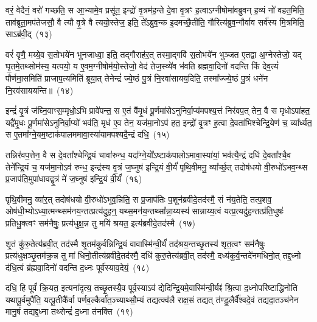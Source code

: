 वरं॒ वेदैनं॒ वरो॑ गच्छति॒ स आ॒भ्यामे॒व प्रसू॑त॒ इन्द्रो॑ वृ॒त्रम॑ह॒न्ते दे॒वा वृ॒त्रꣳ ह॒त्वा\-ऽग्नी\-षोमा॑वब्रुवन् ह॒व्यं नो॑ वहत॒मिति॒ ताव॑ब्रूता॒मप॑तेजसौ॒ वै त्यौ वृ॒त्रे वै त्ययो॒स्तेज॒ इति॒ ते᳚\-ऽब्रुव॒न्क इ॒दमच्छै॒तीति॒ गौरित्य॑ब्रुव॒न्गौर्वाव सर्व॑स्य मि॒त्रमिति॒ सा\-ऽब्र॑वी॒द्~(१३)\ip

वरं॑ वृणै॒ मय्ये॒व स॒तोभये॑न भुनजाध्वा॒ इति॒ तद्गौराह॑र॒त् तस्मा॒द्गवि॑ स॒तोभये॑न भुञ्जत ए॒तद्वा अ॒ग्नेस्तेजो॒ यद् घृ॒तमे॒तथ्सोम॑स्य॒ यत्पयो॒ य ए॒वम॒ग्नी\-षोम॑यो॒स्तेजो॒ वेद॑ तेज॒स्व्ये॑व भ॑वति ब्रह्मवा॒दिनो॑ वदन्ति किं देव॒त्यं॑ पौर्णमा॒समिति॑ प्राजाप॒त्यमिति॑ ब्रूया॒त् तेनेन्द्रं॑ ज्ये॒ष्ठं पु॒त्रं नि॒रवा॑सायय॒दिति॒ तस्मा᳚ज्ज्ये॒ष्ठं पु॒त्रं धने॑न नि॒रव॑साययन्ति॥~(१४)\ip

{\anuvakamend[{अ॒स्य॒ मा वेदा द्यावा॑पृथि॒व्योर॑ब्रवी॒दिति॒ तस्मा᳚च्च॒त्वारि॑ च}]}

इन्द्रं॑ वृ॒त्रं ज॑घ्नि॒वाꣳस॒म्मृधो॒\-ऽभि प्रावे॑पन्त॒ स ए॒तं वै॑मृ॒धं पू॒र्णमा॑से\-ऽनुनिर्वा॒प्य॑मपश्य॒त्तं निर॑वप॒त् तेन॒ वै स मृधो\-ऽपा॑हत॒ यद्वै॑मृ॒धः पू॒र्णमा॑से\-ऽनुनिर्वा॒प्यो॑ भव॑ति॒ मृध॑ ए॒व तेन॒ यज॑मा॒नो\-ऽप॑ हत॒ इन्द्रो॑ वृ॒त्रꣳ ह॒त्वा दे॒वता॑भिश्चेन्द्रि॒येण॑ च॒ व्या᳚र्ध्यत॒ स ए॒तमा᳚ग्ने॒यम॒ष्टाक॑पालममावा॒स्या॑यामपश्यदै॒न्द्रं दधि॒~(१५)\ip

तन्निर॑वप॒त्तेन॒ वै स दे॒वता᳚श्चेन्द्रि॒यं चावा॑रुन्ध॒ यदा᳚ग्ने॒यो᳚\-ऽष्टाक॑पालो\-ऽमावा॒स्या॑यां॒ भव॑त्यै॒न्द्रं दधि॑ दे॒वता᳚श्चै॒व तेने᳚न्द्रि॒यं च॒ यज॑मा॒नो\-ऽव॑ रुन्ध॒ इन्द्र॑स्य वृ॒त्रं ज॒घ्नुष॑ इन्द्रि॒यं वी॒र्यं॑ पृथि॒वीमनु॒ व्या᳚र्च्छ॒त् तदोष॑धयो वी॒रुधो॑\-ऽभव॒न्थ्स प्र॒जा\-प॑ति॒मुपा॑धावद्वृ॒त्रं मे॑ ज॒घ्नुष॑ इन्द्रि॒यं वी॒र्यं॑~(१६)\ip

पृथि॒वीमनु॒ व्या॑र॒त् तदोष॑धयो वी॒रुधो॑\-ऽभूव॒न्निति॒ स प्र॒जा\-प॑तिः प॒शून॑ब्रवीदे॒तद॑स्मै॒ सं न॑य॒तेति॒ तत्प॒शव॒ ओष॑धी॒भ्यो\-ऽध्या॒त्मन्थ्सम॑नय॒न्तत्प्रत्य॑दुह॒न्॒ यथ्स॒मन॑य॒न्तथ्सा᳚न्ना॒य्यस्य॑ सान्नाय्य॒त्वं यत्प्र॒त्यदु॑ह॒न्तत्प्र॑ति॒धुषः॑ प्रतिधु॒क्त्वꣳ सम॑नैषुः॒ प्रत्य॑धुक्ष॒न्न तु मयि॑ श्रयत॒ इत्य॑ब्रवीदे॒तद॑स्मै~(१७)\ip

शृ॒तं कु॑रु॒तेत्य॑ब्रवी॒त् तद॑स्मै शृ॒तम॑कुर्वन्निन्द्रि॒यं वावास्मि॑न्वी॒र्यं॑ तद॑श्रय॒न्तच्छृ॒तस्य॑ शृत॒त्वꣳ सम॑नैषुः॒ प्रत्य॑धुक्षञ्छृ॒तम॑क्र॒न्न तु मा॑ धिनो॒तीत्य॑ब्रवीदे॒तद॑स्मै॒ दधि॑ कुरु॒तेत्य॑ब्रवी॒त् तद॑स्मै॒ दध्य॑कुर्व॒न्तदे॑नमधिनो॒त् तद्द॒ध्नो द॑धि॒त्वं ब्र॑ह्मवा॒दिनो॑ वदन्ति द॒ध्नः पूर्व॑स्याव॒देयं॒~(१८)\ip

दधि॒ हि पूर्वं॑ क्रि॒यत॒ इत्यना॑दृत्य॒ तच्छृ॒तस्यै॒व पूर्व॒स्या\-ऽव॑ द्येदिन्द्रि॒यमे॒वास्मि॑न्वी॒र्यꣴ॑ श्रि॒त्वा द॒ध्नोपरि॑ष्टाद्धिनोति यथापू॒र्वमुपै॑ति॒ यत्पू॒तीकै᳚र्वा पर्णव॒ल्कैर्वा॑त॒ञ्च्याथ्सौ॒म्यं तद्यत्क्व॑लै राक्ष॒सं तद्यत् त॑ण्डु॒लैर्वै᳚श्वदे॒वं तद्यदा॒तञ्च॑नेन मानु॒षं तद्यद्द॒ध्ना तथ्सेन्द्रं॑ द॒ध्ना त॑नक्ति~(१९)\ip

